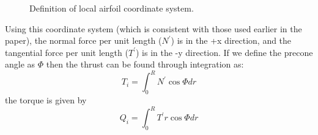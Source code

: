 \documentclass{article}
\begin{document}
\begin{figure}[htbp]
\centering
 \qquad
 \caption{Definition of local airfoil coordinate system.}
 \label{fig:csys}
\end{figure}

Using this coordinate system (which is consistent with those used earlier in the paper), the normal force per unit length ($N^\prime$) is in the +x direction, and the tangential force per unit length ($T^\prime$) is in the -y direction.  If we define the precone angle as $\Phi$ then the thrust can be found through integration as:
\begin{equation}
   T_i = \int_0^R N^\prime \cos\Phi dr
\end{equation}
the torque is given by
\begin{equation}
    Q_i = \int_0^R T^\prime r \cos\Phi dr
\end{equation}
\end{document}
